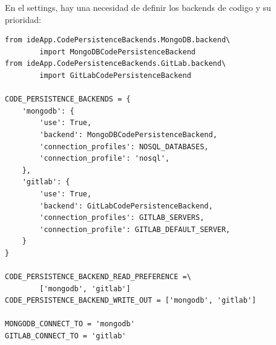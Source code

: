 En el settings, hay una necesidad de definir los backends de codigo y su prioridad:
\lstset{language=Python}
\begin{lstlisting}
from ideApp.CodePersistenceBackends.MongoDB.backend\
        import MongoDBCodePersistenceBackend
from ideApp.CodePersistenceBackends.GitLab.backend\
        import GitLabCodePersistenceBackend

CODE_PERSISTENCE_BACKENDS = {
    'mongodb': {
        'use': True,
        'backend': MongoDBCodePersistenceBackend,
        'connection_profiles': NOSQL_DATABASES,
        'connection_profile': 'nosql',
    },
    'gitlab': {
        'use': True,
        'backend': GitLabCodePersistenceBackend,
        'connection_profiles': GITLAB_SERVERS,
        'connection_profile': GITLAB_DEFAULT_SERVER,
    }
}

CODE_PERSISTENCE_BACKEND_READ_PREFERENCE =\
        ['mongodb', 'gitlab']
CODE_PERSISTENCE_BACKEND_WRITE_OUT = ['mongodb', 'gitlab']

MONGODB_CONNECT_TO = 'mongodb'
GITLAB_CONNECT_TO = 'gitlab'
\end{lstlisting}
\lstset{language=Bash}

